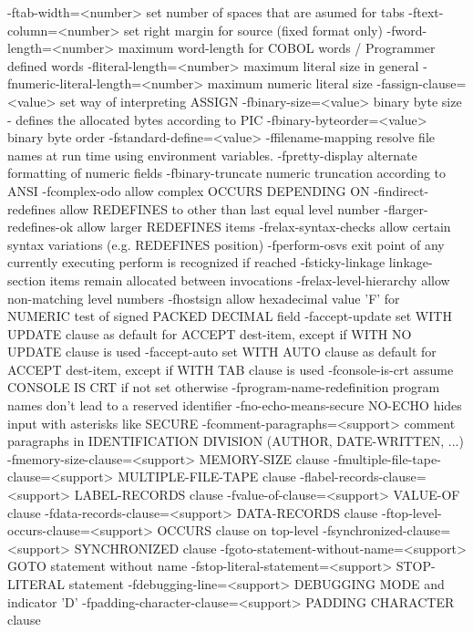   -ftab-width=<number>  set number of spaces that are asumed for tabs
  -ftext-column=<number> set right margin for source (fixed format only)
  -fword-length=<number> maximum word-length for COBOL words / Programmer defined words
  -fliteral-length=<number> maximum literal size in general
  -fnumeric-literal-length=<number> maximum numeric literal size
  -fassign-clause=<value> set way of interpreting ASSIGN
  -fbinary-size=<value> binary byte size - defines the allocated bytes according to PIC
  -fbinary-byteorder=<value> binary byte order
  -fstandard-define=<value> 
  -ffilename-mapping    resolve file names at run time using environment variables.
  -fpretty-display      alternate formatting of numeric fields
  -fbinary-truncate     numeric truncation according to ANSI
  -fcomplex-odo         allow complex OCCURS DEPENDING ON
  -findirect-redefines  allow REDEFINES to other than last equal level number
  -flarger-redefines-ok allow larger REDEFINES items
  -frelax-syntax-checks allow certain syntax variations (e.g. REDEFINES position)
  -fperform-osvs        exit point of any currently executing perform is recognized if reached
  -fsticky-linkage      linkage-section items remain allocated between invocations
  -frelax-level-hierarchy allow non-matching level numbers
  -fhostsign            allow hexadecimal value 'F' for NUMERIC test of signed PACKED DECIMAL field
  -faccept-update       set WITH UPDATE clause as default for ACCEPT dest-item, except if WITH NO UPDATE clause is used
  -faccept-auto         set WITH AUTO clause as default for ACCEPT dest-item, except if WITH TAB clause is used
  -fconsole-is-crt      assume CONSOLE IS CRT if not set otherwise
  -fprogram-name-redefinition program names don't lead to a reserved identifier
  -fno-echo-means-secure NO-ECHO hides input with asterisks like SECURE
  -fcomment-paragraphs=<support> comment paragraphs in IDENTIFICATION DIVISION (AUTHOR, DATE-WRITTEN, ...)
  -fmemory-size-clause=<support> MEMORY-SIZE clause
  -fmultiple-file-tape-clause=<support> MULTIPLE-FILE-TAPE clause
  -flabel-records-clause=<support> LABEL-RECORDS clause
  -fvalue-of-clause=<support> VALUE-OF clause
  -fdata-records-clause=<support> DATA-RECORDS clause
  -ftop-level-occurs-clause=<support> OCCURS clause on top-level
  -fsynchronized-clause=<support> SYNCHRONIZED clause
  -fgoto-statement-without-name=<support> GOTO statement without name
  -fstop-literal-statement=<support> STOP-LITERAL statement
  -fdebugging-line=<support> DEBUGGING MODE and indicator 'D'
  -fpadding-character-clause=<support> PADDING CHARACTER clause

